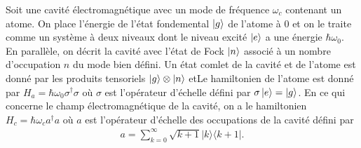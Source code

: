{\footnotesize
Soit une cavité électromagnétique avec un mode de fréquence $\omega_c$ contenant un atome. On place l'énergie de l'état fondemental $\ket{g}$ de l'atome à $0$ et on le traite comme un système à deux niveaux dont le niveau excité $\ket{e}$ a une énergie $\hbar \omega_0$. En parallèle, on décrit la cavité avec l'état de Fock $\ket{n}$ associé à un nombre d'occupation $n$ du mode bien défini. Un état comlet de la cavité et de l'atome est donné par les produits tensoriels $\ket{g} \otimes \ket{n}$ etLe hamiltonien de l'atome est donné par $H_a = \hbar \omega_0\sigma^\dagger \sigma$ où $\sigma$ est l'opérateur d'échelle  défini par $\sigma \ket{e} = \ket{g}$. En ce qui concerne le champ électromagnétique de la cavité, on a le hamiltonien $H_c = \hbar \omega_c a^\dagger a$ où $a$ est l'opérateur d'échelle des occupations de la cavité défini par 
\begin{align}
a = \sum_{k=0}^{\infty} \sqrt{k+1}|k\rangle\langle k+1|. \label{a}
\end{align}

}
